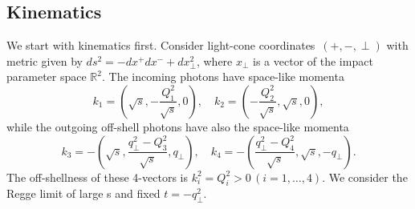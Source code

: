 \documentclass[preprint, 12pt]{elsarticle}
\begin{document}
\subsection{Kinematics}
We start with kinematics first. Consider light-cone coordinates~$\left(+, -, \perp \right)$ with metric given by $ds^2 = - dx^{+} dx^{-} + d x_\perp^2$, where $x_\perp$ is a vector of the impact parameter space $\mathbb{R}^2$. The incoming photons have space-like momenta
\begin{equation}
k_1 = \left( \sqrt{s}, - \frac{Q_1^2}{\sqrt{s}}, 0 \right), \quad k_2 = \left( - \frac{Q_2^2}{\sqrt{s}}, \sqrt{s},  0 \right),
\end{equation}
while the outgoing off-shell photons have also the space-like momenta
\begin{equation}
k_3 = - \left( \sqrt{s},  \frac{q_\perp^2 - Q_3^2}{\sqrt{s}}, q_\perp \right), \quad k_4 = - \left(  \frac{q_\perp^2-Q_4^2}{\sqrt{s}}, \sqrt{s},  -q_\perp \right).
\end{equation}
The off-shellness of these 4-vectors is $k_i^2 = Q_i^2 > 0 \, \left( i = 1, \dots, 4\right)$. We consider the Regge limit of large s and fixed $t = -q_\perp^2$.
\end{document}
